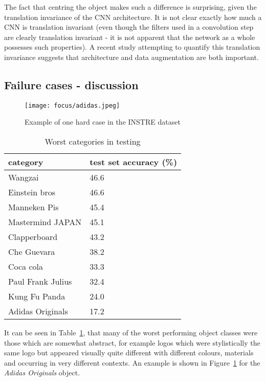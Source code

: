 The fact that centring the object makes such a difference is surprising, given the translation invariance of the CNN architecture. It is not clear exactly how much a CNN is translation invariant (even though the filters used in a convolution step are clearly translation invariant - it is not apparent that the network as a whole possesses such properties). A recent study attempting to quantify this translation invariance \cite{EricKauderer-Abrams2016} suggests that architecture and data augmentation are both important. 


\subsection {Failure cases - discussion}


\begin{figure}[t]
\centering
\texttt{[image: focus/adidas.jpeg]}
\caption{Example of one hard case in the INSTRE dataset}
\label{fig:focus_adidas}
\end{figure}



\begin{table}[h]
\centering
\caption{Worst categories in testing }
\begin{tabular}{ l l }
    category & test set accuracy (\%) \\
  \toprule 
  Wangzai & 46.6 \\
  Einstein bros & 46.6\\
  Manneken Pis & 45.4\\
  Mastermind JAPAN & 45.1\\
  Clapperboard & 43.2\\
  Che Guevara & 38.2\\
  Coca cola & 33.3\\
  Paul Frank Julius & 32.4\\
  Kung Fu Panda & 24.0\\
  Adidas Originals & 17.2\\
  \bottomrule
\end{tabular}
\label{tab:focus_failure}
\end{table}

It can be seen in Table~\ref{tab:focus_failure}, that many of the worst performing object classes were those which are somewhat abstract, for example logos which were stylistically the same logo but appeared visually quite different with different colours, materials and occurring in very different contexts. An example is shown in Figure~\ref{fig:focus_adidas} for the \emph{Adidas Originals} object.

